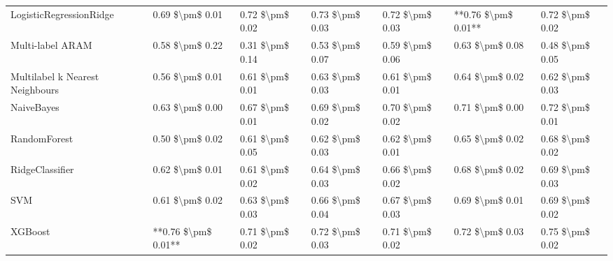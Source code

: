 \begin{tabular}{lllllll}
        LogisticRegressionRidge &     0.69 \$\textbackslash pm\$ 0.01 &           0.72 \$\textbackslash pm\$ 0.02 &       0.73 \$\textbackslash pm\$ 0.03 &        0.72 \$\textbackslash pm\$ 0.03 &                     **0.76 \$\textbackslash pm\$ 0.01** &     0.72 \$\textbackslash pm\$ 0.02 \\
               Multi-label ARAM &     0.58 \$\textbackslash pm\$ 0.22 &           0.31 \$\textbackslash pm\$ 0.14 &       0.53 \$\textbackslash pm\$ 0.07 &        0.59 \$\textbackslash pm\$ 0.06 &                         0.63 \$\textbackslash pm\$ 0.08 &     0.48 \$\textbackslash pm\$ 0.05 \\
Multilabel k Nearest Neighbours &     0.56 \$\textbackslash pm\$ 0.01 &           0.61 \$\textbackslash pm\$ 0.01 &       0.63 \$\textbackslash pm\$ 0.03 &        0.61 \$\textbackslash pm\$ 0.01 &                         0.64 \$\textbackslash pm\$ 0.02 &     0.62 \$\textbackslash pm\$ 0.03 \\
                     NaiveBayes &     0.63 \$\textbackslash pm\$ 0.00 &           0.67 \$\textbackslash pm\$ 0.01 &       0.69 \$\textbackslash pm\$ 0.02 &        0.70 \$\textbackslash pm\$ 0.02 &                         0.71 \$\textbackslash pm\$ 0.00 &     0.72 \$\textbackslash pm\$ 0.01 \\
                   RandomForest &     0.50 \$\textbackslash pm\$ 0.02 &           0.61 \$\textbackslash pm\$ 0.05 &       0.62 \$\textbackslash pm\$ 0.03 &        0.62 \$\textbackslash pm\$ 0.01 &                         0.65 \$\textbackslash pm\$ 0.02 &     0.68 \$\textbackslash pm\$ 0.02 \\
                RidgeClassifier &     0.62 \$\textbackslash pm\$ 0.01 &           0.61 \$\textbackslash pm\$ 0.02 &       0.64 \$\textbackslash pm\$ 0.03 &        0.66 \$\textbackslash pm\$ 0.02 &                         0.68 \$\textbackslash pm\$ 0.02 &     0.69 \$\textbackslash pm\$ 0.03 \\
                            SVM &     0.61 \$\textbackslash pm\$ 0.02 &           0.63 \$\textbackslash pm\$ 0.03 &       0.66 \$\textbackslash pm\$ 0.04 &        0.67 \$\textbackslash pm\$ 0.03 &                         0.69 \$\textbackslash pm\$ 0.01 &     0.69 \$\textbackslash pm\$ 0.02 \\
                        XGBoost & **0.76 \$\textbackslash pm\$ 0.01** &           0.71 \$\textbackslash pm\$ 0.02 &       0.72 \$\textbackslash pm\$ 0.03 &        0.71 \$\textbackslash pm\$ 0.02 &                         0.72 \$\textbackslash pm\$ 0.03 &     0.75 \$\textbackslash pm\$ 0.02 \\
\bottomrule
\end{tabular}
